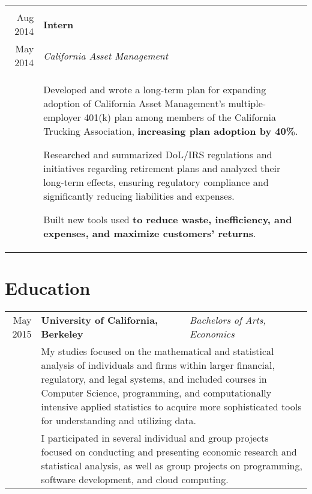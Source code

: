 \documentclass[10pt]{article}
\newcommand{\afterlistspace}[0]{\vspace{-1.5em}}
\begin{document}
\begin{tabular}{r|p{16cm}}
    \\
    \multicolumn{2}{c}{}
    \\

    Aug 2014 & \textbf{Intern}
    \\
    May 2014 & \emph{California Asset Management}
    \\
    & \begin{itemize}
        \footnotesize{

            \item Developed and wrote a long-term plan for expanding adoption of California Asset Management's multiple-employer 401(k) plan among members of the California Trucking Association, \textbf{increasing plan adoption by 40\%}.
            
            \item Researched and summarized DoL/IRS regulations and initiatives regarding retirement plans
            and analyzed their long-term effects, ensuring regulatory compliance and significantly reducing liabilities and expenses.
            
            \item Built new tools used \textbf{to reduce waste, inefficiency, and expenses, and maximize customers' returns}.
        
        }

        \afterlistspace
    \end{itemize}

\end{tabular}


\section{Education}

\begin{tabular}{r|l|p{16cm}}
    May 2015 & \textbf{University of California, Berkeley} & \emph{Bachelors of Arts, Economics}
    \\
    & \multicolumn{2}{p{16cm}}{\footnotesize{My studies focused on the mathematical and statistical analysis of individuals and firms within larger financial, regulatory, and legal systems, and included courses in Computer Science, programming, and computationally intensive applied statistics to acquire more sophisticated tools for understanding and utilizing data.}}
    \\
    & \multicolumn{2}{p{16cm}}{\footnotesize{I participated in several individual and group projects focused on conducting and presenting economic research and statistical analysis, as well as group projects on programming, software development, and cloud computing.}}
\end{tabular}
\end{document}
